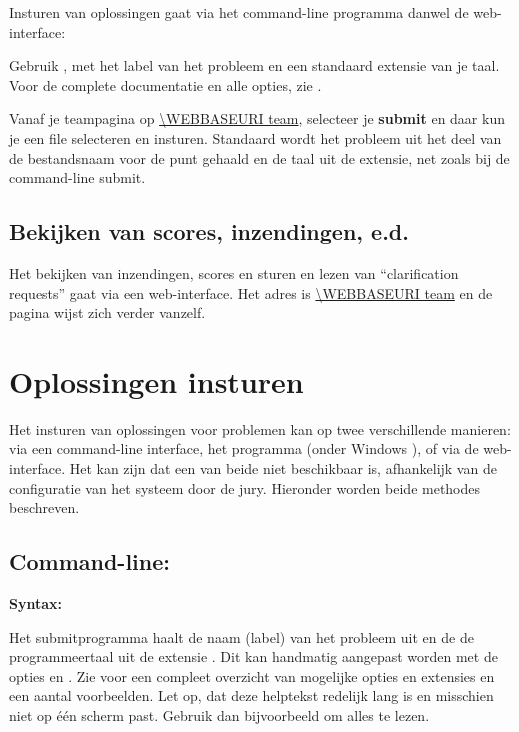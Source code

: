 Insturen van oplossingen gaat via het command-line programma
 danwel de web-interface:
\begin{description}[\breaklabel\setlabelstyle{\bfseries}]
\item[Command-line] 
Gebruik , met  het
label van het probleem en  een standaard extensie van
je taal. Voor de complete documentatie en alle opties, zie .
\item[Web-Interface]
Vanaf je teampagina op \url{\WEBBASEURI team}, selecteer je
\textbf{submit} en daar kun je een file selecteren en insturen.
Standaard wordt het probleem uit het deel van de bestandsnaam voor de
punt gehaald en de taal uit de extensie, net zoals bij de command-line
submit.
\end{description}

\subsection{Bekijken van scores, inzendingen, e.d.}

Het bekijken van inzendingen, scores en sturen en lezen van
``clarification requests'' gaat via een web-interface. Het adres is
\url{\WEBBASEURI team} en de pagina wijst zich verder vanzelf.

\newpage
\section{Oplossingen insturen}\label{submit}

Het insturen van oplossingen voor problemen kan op twee verschillende
manieren: via een command-line interface, het programma 
(onder Windows ), of via de web-interface. Het kan
zijn dat een van beide niet beschikbaar is, afhankelijk van de
configuratie van het systeem door de jury. Hieronder worden beide
methodes beschreven.

\subsection{Command-line: }

\textbf{Syntax:} 

Het submitprogramma haalt de naam (label) van het probleem uit
 en de de programmeertaal uit de extensie
. Dit kan handmatig aangepast worden met de opties
 en . Zie
 voor een compleet overzicht van mogelijke
opties en extensies en een aantal voorbeelden. Let op, dat deze
helptekst redelijk lang is en misschien niet op \'e\'en scherm
past. Gebruik dan bijvoorbeeld  om alles
te lezen.

